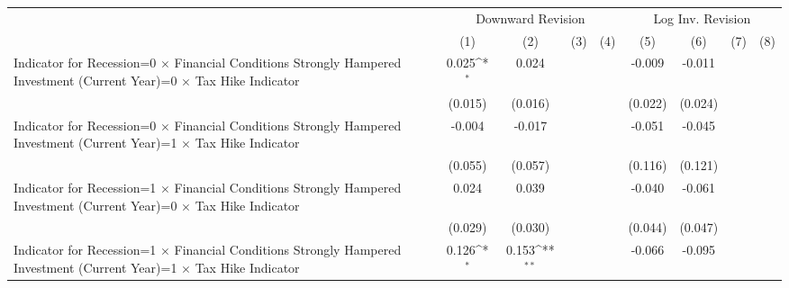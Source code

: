 {
\def\sym#1{\ifmmode^{#1}\else\(^{#1}\)\fi}
\begin{tabular}{l*{8}{c}}
\toprule
                    &\multicolumn{4}{c}{Downward Revision}                                                  &\multicolumn{4}{c}{Log Inv. Revision}                                                  \\\cmidrule(lr){2-5}\cmidrule(lr){6-9}
                    &\multicolumn{1}{c}{(1)}         &\multicolumn{1}{c}{(2)}         &\multicolumn{1}{c}{(3)}         &\multicolumn{1}{c}{(4)}         &\multicolumn{1}{c}{(5)}         &\multicolumn{1}{c}{(6)}         &\multicolumn{1}{c}{(7)}         &\multicolumn{1}{c}{(8)}         \\
\midrule
Indicator for Recession=0 $\times$ Financial Conditions Strongly Hampered Investment (Current Year)=0 $\times$ Tax Hike Indicator&       0.025\sym{*}  &       0.024         &                     &                     &      -0.009         &      -0.011         &                     &                     \\
                    &     (0.015)         &     (0.016)         &                     &                     &     (0.022)         &     (0.024)         &                     &                     \\
Indicator for Recession=0 $\times$ Financial Conditions Strongly Hampered Investment (Current Year)=1 $\times$ Tax Hike Indicator&      -0.004         &      -0.017         &                     &                     &      -0.051         &      -0.045         &                     &                     \\
                    &     (0.055)         &     (0.057)         &                     &                     &     (0.116)         &     (0.121)         &                     &                     \\
Indicator for Recession=1 $\times$ Financial Conditions Strongly Hampered Investment (Current Year)=0 $\times$ Tax Hike Indicator&       0.024         &       0.039         &                     &                     &      -0.040         &      -0.061         &                     &                     \\
                    &     (0.029)         &     (0.030)         &                     &                     &     (0.044)         &     (0.047)         &                     &                     \\
Indicator for Recession=1 $\times$ Financial Conditions Strongly Hampered Investment (Current Year)=1 $\times$ Tax Hike Indicator&       0.126\sym{*}  &       0.153\sym{**} &                     &                     &      -0.066         &      -0.095         &                     &                     \\

\end{tabular}}
